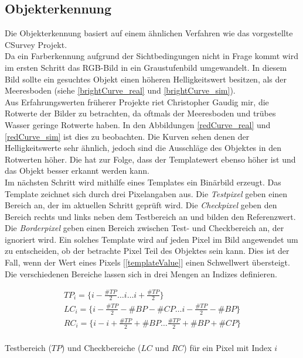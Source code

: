 \subsection{Objekterkennung}
\label{sec_objDet}
Die Objekterkennung basiert auf einem ähnlichen Verfahren wie das vorgestellte CSurvey Projekt\cite{Albiez2015CSurveyA}.\\
Da ein Farberkennung aufgrund der Sichtbedingungen nicht in Frage kommt wird im ersten Schritt das RGB-Bild in ein Graustufenbild umgewandelt. In diesem Bild sollte ein gesuchtes Objekt einen höheren Helligkeitswert besitzen, als der Meeresboden (siehe \ref{brightCurve_real} und \ref{brightCurve_sim}).\\
Aus Erfahrungswerten früherer Projekte riet Christopher Gaudig mir, die Rotwerte der Bilder zu betrachten, da oftmals der Meeresboden und trübes Wasser geringe Rotwerte haben. In den Abbildungen \ref{redCurve_real} und \ref{redCurve_sim} ist dies zu beobachten. Die Kurven sehen denen der Helligkeitswerte sehr ähnlich, jedoch sind die Ausschläge des Objektes in den Rotwerten höher. Die hat zur Folge, dass der Templatewert ebenso höher ist und das Objekt besser erkannt werden kann.\\
Im nächsten Schritt wird mithilfe eines Templates ein Binärbild erzeugt. Das Template zeichnet sich durch drei Pixelangaben aus. Die \textit{Testpixel} geben einen Bereich an, der im aktuellen Schritt geprüft wird. Die \textit{Checkpixel} geben den Bereich rechts und links neben dem Testbereich an und bilden den Referenzwert. Die \textit{Borderpixel} geben einen Bereich zwischen Test- und Checkbereich an, der ignoriert wird. Ein solches Template wird auf jeden Pixel im Bild angewendet um zu entscheiden, ob der betrachte Pixel Teil des Objektes sein kann. Dies ist der Fall, wenn der Wert eines Pixels [\ref{templateValue}] einen Schwellwert übersteigt.\\
Die verschiedenen Bereiche lassen sich in drei Mengen an Indizes definieren.
\begin{ownequation}[H]
\begin{eqnarray}
TP_i = \{i-\frac{\#TP}{2} \dots i \dots i+\frac{\#TP}{2}\}\\
LC_i = \{i-\frac{\#TP}{2}-\#BP-\#CP \dots i-\frac{\#TP}{2}-\#BP\}\\
RC_i = \{i-i+\frac{\#TP}{2}+\#BP \dots \frac{\#TP}{2}+\#BP+\#CP\}\\
\end{eqnarray}
\caption{Testbereich ($TP$) und Checkbereiche ($LC$ und $RC$) für ein Pixel mit Index $i$}
\end{ownequation}
